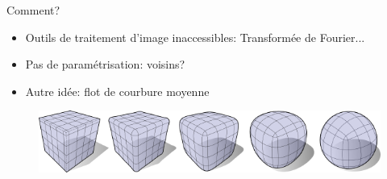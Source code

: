 \documentclass{beamer}
\begin{document}
\begin{frame}[allowframebreaks]
    \newpage
    Comment?
    \begin{itemize}
        \item Outils de traitement d'image inaccessibles: Transformée de
            Fourier...
        \item Pas de paramétrisation: voisins?
        \item Autre idée: flot de courbure moyenne
    \end{itemize}

    \begin{figure}
        \centering
        \includegraphics[scale=0.3]{img/mean-curvature-flow-cube}
    \end{figure}
\end{frame}
\end{document}
